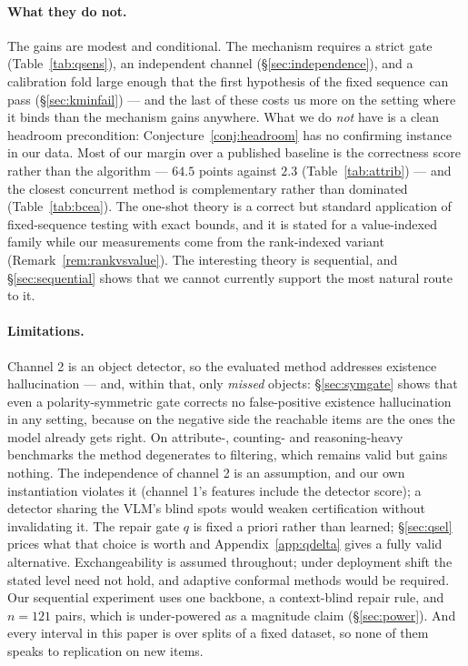 \documentclass{article}
\theoremstyle{plain}
\theoremstyle{definition}
\theoremstyle{remark}
\begin{document}
\paragraph{What they do not.}
The gains are modest and conditional. The mechanism requires a strict gate
(Table~\ref{tab:qsens}), an independent channel (\S\ref{sec:independence}), and a calibration
fold large enough that the first hypothesis of the fixed sequence can pass
(\S\ref{sec:kminfail}) --- and the last of these costs us more on the setting where it binds than
the mechanism gains anywhere. What we do \emph{not} have is a clean headroom precondition:
Conjecture~\ref{conj:headroom} has no confirming instance
in our data. Most of our margin over a published baseline is the correctness score rather than
the algorithm --- $64.5$ points against $2.3$ (Table~\ref{tab:attrib}) --- and the closest
concurrent method is complementary rather than dominated (Table~\ref{tab:bcea}). The one-shot
theory is a correct but standard application of fixed-sequence testing with exact bounds, and it
is stated for a value-indexed family while our measurements come from the rank-indexed variant
(Remark~\ref{rem:rankvsvalue}). The interesting theory is sequential, and
\S\ref{sec:sequential} shows that we cannot currently support the most natural route to it.

\paragraph{Limitations.}
Channel 2 is an object detector, so the evaluated method addresses existence hallucination ---
and, within that, only \emph{missed} objects: \S\ref{sec:symgate} shows that even a
polarity-symmetric gate corrects no false-positive existence hallucination in any setting,
because on the negative side the reachable items are the ones the model already gets right. On
attribute-, counting- and reasoning-heavy benchmarks the method degenerates to filtering, which
remains valid but gains nothing. The independence of channel 2 is an assumption, and our own
instantiation violates it (channel 1's features include the detector score); a detector sharing
the VLM's blind spots would weaken certification without invalidating it. The repair gate $q$ is
fixed a priori rather than learned; \S\ref{sec:qsel} prices what that choice is worth and
Appendix~\ref{app:qdelta} gives a fully valid alternative. Exchangeability is assumed throughout;
under deployment shift the stated level need not hold, and adaptive conformal methods
\citep{gibbs2021} would be required. Our sequential experiment uses one backbone, a context-blind
repair rule, and $n=121$ pairs, which is under-powered as a magnitude claim
(\S\ref{sec:power}). And every interval in this paper is over splits of a fixed dataset, so none
of them speaks to replication on new items.
\end{document}
